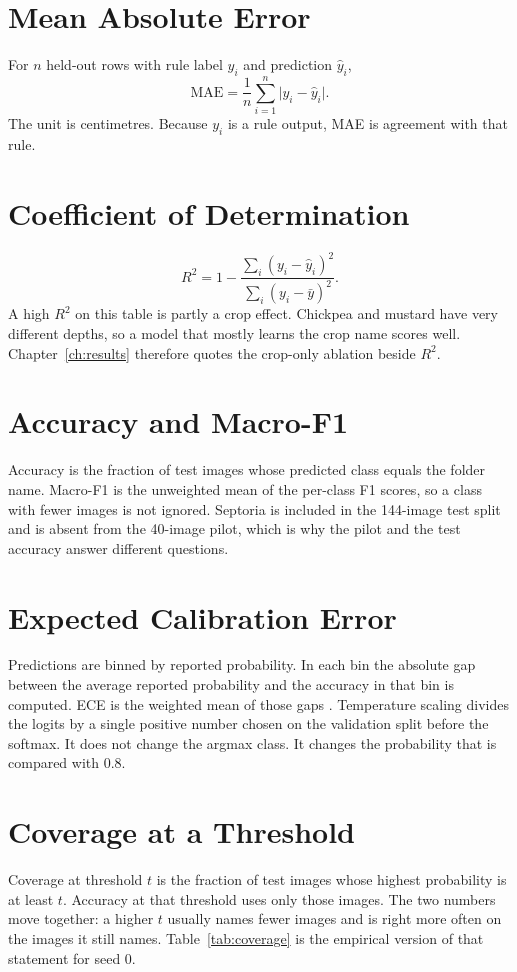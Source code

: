 \section{Mean Absolute Error}
For $n$ held-out rows with rule label $y_i$ and prediction $\hat{y}_i$,
\begin{equation}
\mathrm{MAE} = \frac{1}{n} \sum_{i=1}^{n} \lvert y_i - \hat{y}_i \rvert.
\end{equation}
The unit is centimetres. Because $y_i$ is a rule output, MAE is agreement with that rule.

\section{Coefficient of Determination}
\begin{equation}
R^{2} = 1 - \frac{\sum_{i} (y_i - \hat{y}_i)^{2}}{\sum_{i} (y_i - \bar{y})^{2}}.
\end{equation}
A high $R^{2}$ on this table is partly a crop effect. Chickpea and mustard have very different depths, so a model that mostly learns the crop name scores well. Chapter~\ref{ch:results} therefore quotes the crop-only ablation beside $R^{2}$.

\section{Accuracy and Macro-F1}
Accuracy is the fraction of test images whose predicted class equals the folder name. Macro-F1 is the unweighted mean of the per-class F1 scores, so a class with fewer images is not ignored. Septoria is included in the 144-image test split and is absent from the 40-image pilot, which is why the pilot and the test accuracy answer different questions.

\section{Expected Calibration Error}
Predictions are binned by reported probability. In each bin the absolute gap between the average reported probability and the accuracy in that bin is computed. ECE is the weighted mean of those gaps \cite{guo2017calibration}. Temperature scaling divides the logits by a single positive number chosen on the validation split before the softmax. It does not change the argmax class. It changes the probability that is compared with 0.8.

\section{Coverage at a Threshold}
Coverage at threshold $t$ is the fraction of test images whose highest probability is at least $t$. Accuracy at that threshold uses only those images. The two numbers move together: a higher $t$ usually names fewer images and is right more often on the images it still names. Table~\ref{tab:coverage} is the empirical version of that statement for seed 0.


